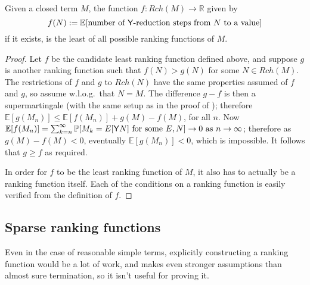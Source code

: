 \begin{theorem} \label{thm:minimal}
Given a closed term $M$, the function $f:Rch(M) \to \mathbb R$ given by 
\[
f(N) := \mathbb E [\text{number of }\mathsf{Y}\text{-reduction steps from }N\text{ to a value}]
\] 
if it exists, is the least of all possible ranking functions of $M$.
\end{theorem}
\begin{proof}
Let $f$ be the candidate least ranking function defined above, and suppose $g$ is another ranking function such that $f(N) > g(N)$ for some $N \in Rch(M)$. The restrictions of $f$ and $g$ to $Rch(N)$ have the same properties assumed of $f$ and $g$, so assume w.l.o.g.~that $N=M$. The difference $g - f$ is then a supermartingale (with the same setup as in the proof of %
);
therefore $\mathbb E[g(M_n)] \leq \mathbb E[f(M_n)] + g(M)-f(M)$, for all $n$.
Now $\mathbb E[f(M_n)] = \sum_{k=n}^\infty \mathbb P[M_k = E[\mathsf{Y} N] \text{ for some }E, N] \to 0 \text{ as } n \to \infty$; 
therefore as $g(M) - f(M) < 0$, eventually $\mathbb E[g(M_n)] < 0$, which is impossible. 
It follows that $g \geq f$ as required.

In order for $f$ to be the least ranking function of $M$, it also has to actually be a ranking function itself. Each of the conditions on a ranking function is easily verified from the definition of $f$.
\end{proof}

\subsection{Sparse ranking functions}
Even in the case of reasonable simple terms, explicitly constructing a ranking function would be a lot of work, and  makes even stronger assumptions than almost sure termination, so it isn't useful for proving it.

